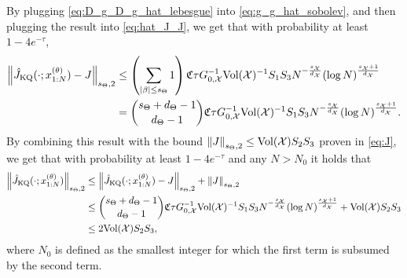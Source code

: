 By plugging \eqref{eq:D_g_D_g_hat_lebesgue} into \eqref{eq:g_g_hat_sobolev}, and then plugging the result into \eqref{eq:hat_J_J}, we get that with probability at least $ 1 - 4e^{-\tau}$, 
\begin{align}\label{eq:hat_j_j_sobolev}
    \left\| \hat{J}_{\text{KQ}}(\cdot; x_{1:N}^{(\theta)}) - J \right\|_{s_\Theta, 2} &\leq \left(\sum_{|\beta| \leq s_\Theta } 1 \right) \mathfrak{C} \tau 
    G_{0, \mathcal{X}}^{-1} \text{Vol}(\mathcal{X})^{-1}  S_1 S_3 N^{-\frac{s_{\mathcal{X}}}{d_{\mathcal{X}}}}  (\log N)^{\frac{s_{\mathcal{X}}+1}{d_{\mathcal{X}}}} \nonumber \\
    &= \binom{s_\Theta + d_\Theta -1}{d_\Theta -1} \mathfrak{C} \tau 
    G_{0, \mathcal{X}}^{-1} \text{Vol}(\mathcal{X})^{-1}  S_1 S_3 N^{-\frac{s_{\mathcal{X}}}{d_{\mathcal{X}}}}  (\log N)^{\frac{s_{\mathcal{X}}+1}{d_{\mathcal{X}}}}.
\end{align}
By combining this result with the bound $\left\| J \right\|_{s_\Theta, 2} \leq \text{Vol}(\mathcal{X})  S_2 S_3$ proven in \eqref{eq:J}, we get that with probability at least $ 1 - 4e^{-\tau}$ and any $N>N_0$ it holds that
\begin{align}\label{eq:hat_J_sobolev_norm}
    \left\| \hat{J}_{\text{KQ}}(\cdot; x_{1:N}^{(\theta)}) \right\|_{s_\Theta, 2} &\leq \left\| \hat{J}_{\text{KQ}}(\cdot; x_{1:N}^{(\theta)}) - J \right\|_{s_\Theta, 2} + \left\| J \right\|_{s_\Theta, 2} \nonumber \\
    &\leq \binom{s_\Theta + d_\Theta -1}{d_\Theta -1} \mathfrak{C}  \tau 
    G_{0, \mathcal{X}}^{-1} \text{Vol}(\mathcal{X})^{-1}  S_1 S_3 N^{-\frac{s_{\mathcal{X}}}{d_{\mathcal{X}}}}  (\log N)^{\frac{s_{\mathcal{X}}+1}{d_{\mathcal{X}}}} + \text{Vol}(\mathcal{X})  S_2 S_3 \nonumber \\
    &\leq 2 \text{Vol}(\mathcal{X})  S_2 S_3,
\end{align}
where $N_0$ is defined as the smallest integer for which the first term is subsumed by the second term.

